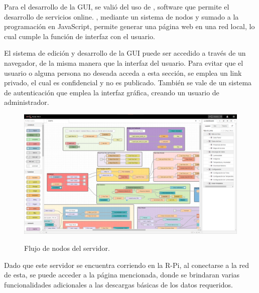 Para el desarrollo de la GUI, se valió del uso de \nodered, software que permite el desarrollo de servicios online. \nodered, mediante un sistema de nodos y sumado a la programación en JavaScript, permite generar una página web en una red local, lo cual cumple la función de interfaz con el usuario.

El sistema de edición y desarrollo de la GUI puede ser accedido a través de un navegador, de la misma manera que la interfaz del usuario. Para evitar que el usuario o alguna persona no deseada acceda a esta sección, se emplea un link privado, el cual es confidencial y no es publicado. También se vale de un sistema de autenticación que emplea la interfaz gráfica, creando un usuario de administrador.
\begin{figure}[H]
	\centering
	\includegraphics[width=0.9\linewidth]{ImagenesIngenieria de Detalle/Node-Red-Flow}
	\label{fig:node_red_flow}
	\caption{Flujo de nodos del servidor.}
\end{figure}

Dado que este servidor se encuentra corriendo en la R-Pi, al conectarse a la red de esta, se puede acceder a la página mencionada, donde se brindaran varias funcionalidades adicionales a las descargas básicas de los datos requeridos.


